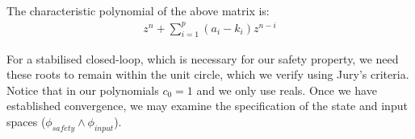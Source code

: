 \documentclass[runningheads,a4paper]{llncs}
\begin{document}
The characteristic polynomial of the above matrix is:
%
\begin{align*}
z^n+\sum_{i=1}^p{(a_i-k_i)z^{n-i}}
\end{align*}

For a stabilised closed-loop, which is necessary for our safety property, we need
these roots to remain within the unit circle, which we verify using Jury's criteria.
Notice that in our polynomials $c_0=1$ and we only use reals.
Once we have established convergence, we may examine the 
specification of the state and input spaces ($\phi_{safety} \wedge \phi_{input}$).
\end{document}
